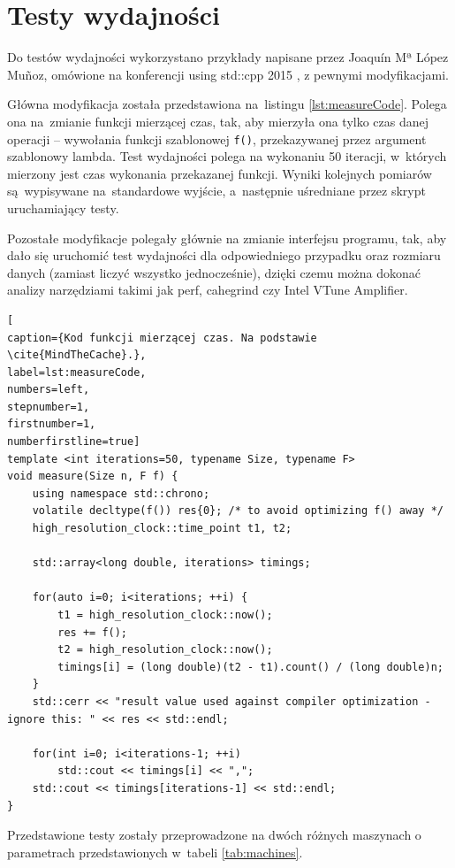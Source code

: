 \chapter{Testy wydajności}
\label{cha:benchmarks}

Do testów wydajności wykorzystano przykłady napisane przez Joaquín Mª López Muñoz, omówione na konferencji using std::cpp 2015 \cite{MindTheCache}, z pewnymi modyfikacjami.

Główna modyfikacja została przedstawiona na~listingu \ref{lst:measureCode}. Polega ona na~zmianie funkcji mierzącej czas, tak, aby mierzyła ona tylko czas danej operacji -- wywołania funkcji szablonowej \texttt{f()}, przekazywanej przez argument szablonowy lambda. Test wydajności polega na wykonaniu 50 iteracji, w~których mierzony jest czas wykonania przekazanej funkcji. Wyniki kolejnych pomiarów są~wypisywane na~standardowe wyjście, a~następnie uśredniane przez skrypt uruchamiający testy.

Pozostałe modyfikacje polegały głównie na zmianie interfejsu programu, tak, aby dało się uruchomić test wydajności dla odpowiedniego przypadku oraz rozmiaru danych (zamiast liczyć wszystko jednocześnie), dzięki czemu można dokonać analizy narzędziami takimi jak perf, cahegrind czy Intel VTune Amplifier.

\begin{lstlisting}[
caption={Kod funkcji mierzącej czas. Na podstawie \cite{MindTheCache}.},
label=lst:measureCode,
numbers=left,
stepnumber=1,    
firstnumber=1,
numberfirstline=true]
template <int iterations=50, typename Size, typename F>
void measure(Size n, F f) {
    using namespace std::chrono;
    volatile decltype(f()) res{0}; /* to avoid optimizing f() away */
    high_resolution_clock::time_point t1, t2;
    
    std::array<long double, iterations> timings;
    
    for(auto i=0; i<iterations; ++i) {
        t1 = high_resolution_clock::now();
        res += f();
        t2 = high_resolution_clock::now();
        timings[i] = (long double)(t2 - t1).count() / (long double)n;
    }
    std::cerr << "result value used against compiler optimization - ignore this: " << res << std::endl;
    
    for(int i=0; i<iterations-1; ++i)
        std::cout << timings[i] << ",";
    std::cout << timings[iterations-1] << std::endl;
}
\end{lstlisting}

Przedstawione testy zostały przeprowadzone na dwóch różnych maszynach o parametrach przedstawionych w~tabeli \ref{tab:machines}.


